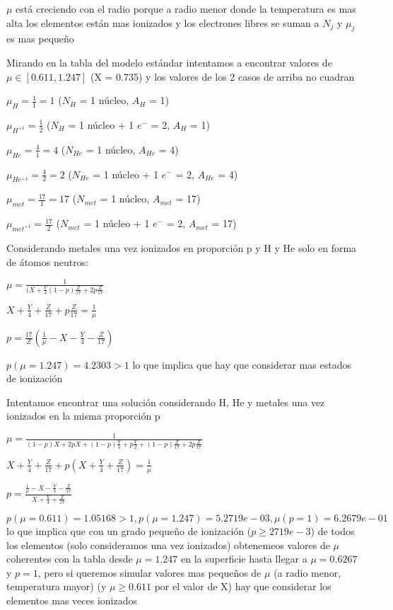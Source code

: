 \documentclass[10pt]{book}
\begin{document}
\begin{description}
$\mu$ está creciendo con el radio porque a radio menor donde la temperatura es mas alta los elementos están mas ionizados y los electrones libres se suman a $N_j$ y $ \mu_j $ es mas pequeño

Mirando en la tabla del modelo estándar intentamos a encontrar valores de $\mu \in [0.611, 1.247]$ (X = 0.735) y los valores de los 2 casos de arriba no cuadran


$ \mu_H  = \frac{1}{1} = 1$ ($N_H$ = 1 núcleo, $A_H$ = 1)

$ \mu_{H^{+1}}  = \frac{1}{2} $ ($N_H$ = 1 núcleo + 1 $e^-$ = 2, $A_H$ = 1)

$ \mu_{He}  = \frac{4}{1} = 4$ ($N_{He}$ = 1 núcleo, $A_{He}$ = 4)

$ \mu_{He^{+1}}  = \frac{4}{2} = 2$ ($N_{He}$ = 1 núcleo + 1 $e^-$ = 2, $A_{He}$ = 4)

$ \mu_{met}  = \frac{17}{1} = 17$ ($N_{met}$ = 1 núcleo, $A_{met}$ = 17)

$ \mu_{met^{+1}}  = \frac{17}{2}$ ($N_{met}$ = 1 núcleo + 1 $e^{-}$ = 2, $A_{met}$ = 17)

Considerando  metales una vez ionizados en proporción p y H y He solo en forma de átomos neutros:

$ \mu = \frac{1}{(X + \frac{Y}{4}  (1-p)\frac{Z}{17} + 2 p \frac{Z}{17}}$

$ X + \frac{Y}{4} +\frac{Z}{17}+  p \frac{Z}{17} = \frac{1}{\mu} $

$ p = \frac{17}{Z} (\frac{1}{\mu} - X - \frac{Y}{4} - \frac{Z}{17}) $

$p(\mu = 1.247) = 4.2303 > 1$ lo que implica que hay que considerar mas estados de ionización

Intentamos encontrar una solución considerando H, He y metales una vez ionizados en la misma proporción p

$ \mu = \frac{1}{(1-p)X + 2p X+ (1-p)\frac{Y}{4} + p \frac{Y}{2}+ (1-p)\frac{Z}{17} + 2 p \frac{Z}{17}}$

$ X + \frac{Y}{4} +\frac{Z}{17}+  p (X + \frac{Y}{4} + \frac{Z}{17}) = \frac{1}{\mu} $

$ p = \frac{\frac{1}{\mu} - X - \frac{Y}{4} - \frac{Z}{17}}{X + \frac{Y}{4} + \frac{Z}{17}} $

$p(\mu = 0.611) = 1.05168 > 1, p(\mu = 1.247) = 5.2719e-03, \mu(p = 1) = 6.2679e-01 $ lo que 
implica que con un grado pequeño de ionización ($p \ge 2719e-3$) de todos los elementos (solo consideramos una vez ionizados) 
obtenemeos valores de $\mu$ coherentes con la tabla desde  $\mu = 1.247$  en la superficie  hasta llegar  a $\mu = 0.6267$ y $p=1$, 
pero si queremos simular valores mas pequeños de $\mu$ (a radio menor, temperatura mayor)
 (y $\mu \ge 0.611$ por el valor de X) hay que considerar los elementos mas veces ionizados 



\end{description}
\end{document}

